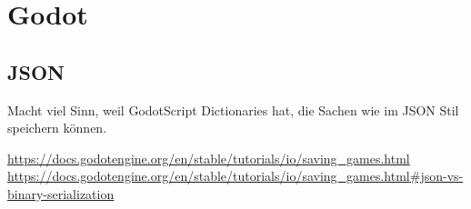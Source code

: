 \section{Godot}

\subsection{JSON}
Macht viel Sinn, weil GodotScript Dictionaries hat, die Sachen wie im JSON Stil speichern 
können.

\url{https://docs.godotengine.org/en/stable/tutorials/io/saving_games.html}\\
\url{https://docs.godotengine.org/en/stable/tutorials/io/saving_games.html#json-vs-binary-serialization}